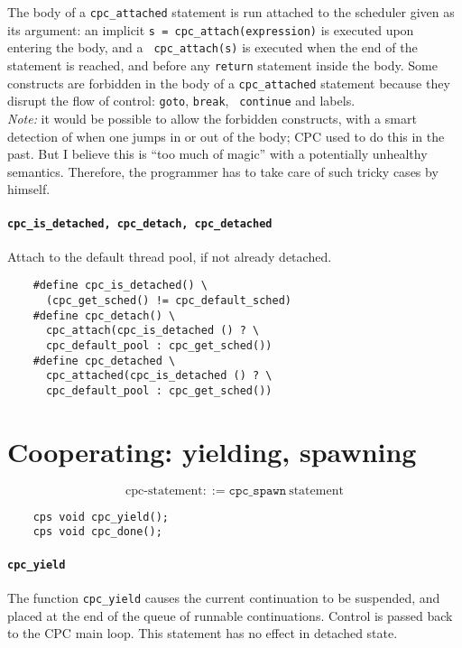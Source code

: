 \documentclass[a4paper]{report}
\begin{document}
The body of a {\tt cpc\_attached} statement is run attached to the
scheduler given as its argument: an implicit {\tt s =
cpc\_attach(expression)} is executed upon entering the body, and a {\tt
cpc\_attach(s)} is executed when the end of the statement is reached,
and before any {\tt return} statement inside the body.  Some constructs
are forbidden in the body of a {\tt cpc\_attached} statement because
they disrupt the flow of control: {\tt goto}, {\tt break}, {\tt
continue} and labels.\\
{\em Note:\/} it would be possible to allow the forbidden constructs,
with a smart detection of when one jumps in or out of the body; CPC used
to do this in the past.  But I believe this is ``too much of magic''
with a potentially unhealthy semantics.  Therefore, the programmer has
to take care of such tricky cases by himself.

\paragraph{\tt cpc\_is\_detached, cpc\_detach, cpc\_detached} Attach to
the default thread pool, if not already detached.
\begin{verbatim}
    #define cpc_is_detached() \
      (cpc_get_sched() != cpc_default_sched)
    #define cpc_detach() \
      cpc_attach(cpc_is_detached () ? \
      cpc_default_pool : cpc_get_sched())
    #define cpc_detached \
      cpc_attached(cpc_is_detached () ? \
      cpc_default_pool : cpc_get_sched())
\end{verbatim}
\section{Cooperating: yielding, spawning} \label{sec:cooperating}

\[ \mbox{cpc-statement} ::=
   \mathtt{cpc\_spawn}\ \mbox{statement} \]
\begin{verbatim}
    cps void cpc_yield();
    cps void cpc_done();
\end{verbatim}

\paragraph{\tt cpc\_yield} The function {\tt cpc\_yield} causes the
current continuation to be suspended, and placed at the end of the
queue of runnable continuations.  Control is passed back to the CPC
main loop.  This statement has no effect in detached state.
\end{document}
